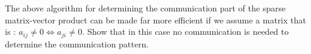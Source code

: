   The above algorithm for determining the communication part of the
  sparse matrix-vector product can be made far more efficient if we
  assume a matrix that is :
  $a_{ij}\not=0\Leftrightarrow a_{ji}\not=0$. Show that in this case
  no communication is needed to determine the communication pattern.

